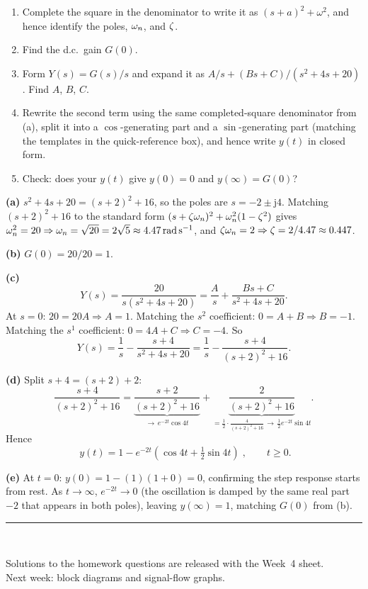 \documentclass[11pt,a4paper]{article}
\newif\ifsolutions
\begin{document}
\begin{enumerate}[label=(\alph*)]
\item Complete the square in the denominator to write it as
      $(s+a)^2+\omega^2$, and hence identify the poles, $\omega_{n}$, and $\zeta$.
\item Find the d.c.\ gain $G(0)$.
\item Form $Y(s)=G(s)/s$ and expand it as $A/s+(Bs+C)/(s^2+4s+20)$. Find
      $A$, $B$, $C$.
\item Rewrite the second term using the same completed-square denominator
      from (a), split it into a $\cos$-generating part and a
      $\sin$-generating part (matching the templates in the quick-reference
      box), and hence write $y(t)$ in closed form.
\item Check: does your $y(t)$ give $y(0)=0$ and $y(\infty)=G(0)$?
\end{enumerate}

\begin{solution}
\textbf{(a)} $s^2+4s+20=(s+2)^2+16$, so the poles are $s=-2\pm\mathrm{j}4$.
Matching $(s+2)^2+16$ to the standard form $(s+\zeta\omega_{n})^2+\omega_{n}^2(1-\zeta^2)$
gives $\omega_{n}^2=20\Rightarrow\omega_{n}=\sqrt{20}=2\sqrt5\approx\SI{4.47}{\radian\per\second}$,
and $\zeta\omega_{n}=2\Rightarrow\zeta=2/4.47\approx0.447$.

\medskip
\textbf{(b)} $G(0)=20/20=1$.

\medskip
\textbf{(c)}
\[
  Y(s)=\frac{20}{s(s^2+4s+20)}=\frac{A}{s}+\frac{Bs+C}{s^2+4s+20}.
\]
At $s=0$: $20=20A\Rightarrow A=1$. Matching the $s^2$ coefficient:
$0=A+B\Rightarrow B=-1$. Matching the $s^1$ coefficient:
$0=4A+C\Rightarrow C=-4$. So
\[
  Y(s)=\frac{1}{s}-\frac{s+4}{s^2+4s+20}=\frac{1}{s}-\frac{s+4}{(s+2)^2+16}.
\]

\medskip
\textbf{(d)} Split $s+4=(s+2)+2$:
\[
  \frac{s+4}{(s+2)^2+16}=\underbrace{\frac{s+2}{(s+2)^2+16}}_{\to\,e^{-2t}\cos4t}
  +\underbrace{\frac{2}{(s+2)^2+16}}_{=\frac12\cdot\frac{4}{(s+2)^2+16}\,\to\,\frac12e^{-2t}\sin4t}.
\]
Hence
\[
  \boxed{\;y(t)=1-e^{-2t}\left(\cos4t+\tfrac12\sin4t\right)\;},\qquad t\ge0.
\]

\medskip
\textbf{(e)} At $t=0$: $y(0)=1-(1)(1+0)=0$, confirming the step response
starts from rest. As $t\to\infty$, $e^{-2t}\to0$ (the oscillation is damped
by the same real part $-2$ that appears in both poles), leaving $y(\infty)=1$,
matching $G(0)$ from (b).
\end{solution}

\vfill
\begin{center}
\rule{0.5\textwidth}{0.4pt}\\[4pt]
{\small\itshape
\ifsolutions
  End of solutions. Week~4: block diagrams and signal-flow graphs.
\else
  Solutions to the homework questions are released with the Week~4 sheet.\\
  Next week: block diagrams and signal-flow graphs.
\fi}
\end{center}
\end{document}
